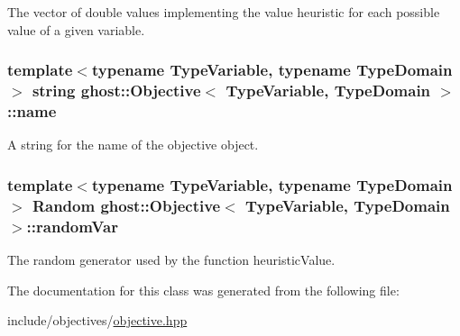 The vector of double values implementing the value heuristic for each possible value of a given variable. 

\hypertarget{classghost_1_1Objective_ae9533a52b3600c826df6e20c65db1e7a}{
\subsubsection[{name}]{\setlength{\rightskip}{0pt plus 5cm}template$<$typename Type\-Variable, typename Type\-Domain$>$ string {\bf ghost\-::\-Objective}$<$ Type\-Variable, Type\-Domain $>$\-::name\hspace{0.3cm}{\ttfamily [protected]}}}\label{classghost_1_1Objective_ae9533a52b3600c826df6e20c65db1e7a}


A string for the name of the objective object. 

\hypertarget{classghost_1_1Objective_a442da333edc70f47c33a15987c2a81b8}{
\subsubsection[{random\-Var}]{\setlength{\rightskip}{0pt plus 5cm}template$<$typename Type\-Variable, typename Type\-Domain$>$ {\bf Random} {\bf ghost\-::\-Objective}$<$ Type\-Variable, Type\-Domain $>$\-::random\-Var\hspace{0.3cm}{\ttfamily [protected]}}}\label{classghost_1_1Objective_a442da333edc70f47c33a15987c2a81b8}


The random generator used by the function heuristic\-Value. 



The documentation for this class was generated from the following file\-:\begin{DoxyCompactItemize}
\item 
include/objectives/\hyperlink{objective_8hpp}{objective.\-hpp}\end{DoxyCompactItemize}

